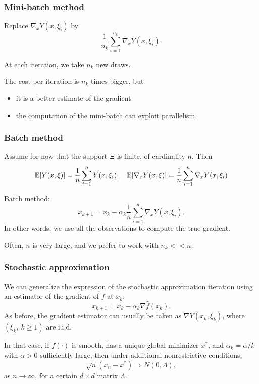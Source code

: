 \documentclass[usepdftitle=false, aspectratio=169]{beamer}
\begin{document}
\begin{frame}
\frametitle{Mini-batch method}

Replace $\nabla_x Y(x,\xi_i)$ by
$$
\frac{1}{n_k} \sum_{i = 1}^{n_k} \nabla_x Y(x,\xi_i).
$$

\mbox{}

At each iteration, we take $n_k$ new draws.

\mbox{}

The cost per iteration is $n_k$ times bigger, but
\begin{itemize}
	\item it is a better estimate of the gradient
	\item the computation of the mini-batch can exploit parallelism
\end{itemize}

\end{frame}

\begin{frame}
\frametitle{Batch method}

Assume for now that the support $\Xi$ is finite, of cardinality $n$. Then
$$
{\mathbb{E}}[Y(x,\xi)] = \frac{1}{n} \sum_{i = 1}^n Y(x,\xi_i), \quad {\mathbb{E}}[\nabla_x Y(x,\xi)] = \frac{1}{n} \sum_{i = 1}^n \nabla_x Y(x,\xi_i)
$$

\mbox{}

Batch method:
$$
x_{k+1} = x_k - \alpha_k \frac{1}{n} \sum_{i = 1}^{n} \nabla_x Y(x,\xi_i).
$$
In other words, we use all the observations to compute the true gradient.

\mbox{}

Often, $n$ is very large, and we prefer to work with $n_k << n$.

\end{frame}

\begin{frame}
\frametitle{Stochastic approximation}

We can generalize the expression of the stochastic approximation iteration using an estimator of the gradient of $f$ at $x_k$:
$$
x_{k+1} = x_k - \alpha_k\nabla\hat{f}(x_k).
$$
As before, the gradient estimator can usually be taken as $\nabla Y ( x_k, \xi_k )$,
where $(\xi_k,\ k \geq 1)$ are i.i.d.

\mbox{}

In that case, if $f(\cdot)$ is smooth, has a unique global minimizer $x^*$, and $\alpha_k = \alpha / k$ with $\alpha > 0$ sufficiently large, then under additional nonrestrictive conditions,
$$
\sqrt{n} \left(x_n - x^*\right) \Rightarrow N(0, \Lambda), 
$$
as $n \rightarrow \infty$, for a certain $d \times d$ matrix $\Lambda$.

\end{frame}
\end{document}
